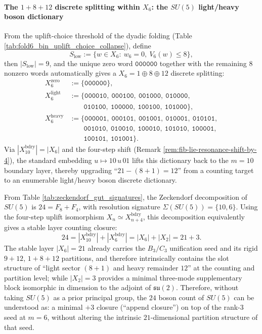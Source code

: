 \paragraph{The \(1+8+12\) discrete splitting within \texorpdfstring{$X_6$}{X6}: the \texorpdfstring{$SU(5)$}{SU(5)} light/heavy boson dictionary}
From the uplift-choice threshold of the dyadic folding (Table \ref{tab:fold6_bin_uplift_choice_collapse}), define
\[
S_{\mathrm{low}}:=\{w\in X_6:\ w_6=0,\ V_6(w)\le 8\},
\]
then \(|S_{\mathrm{low}}|=9\), and the unique zero word \(\texttt{000000}\) together with the remaining \(8\) nonzero words automatically gives a
\(
X_6=1\oplus 8\oplus 12
\)
discrete splitting:
\[
\begin{aligned}
X_6^{\mathrm{zero}}&:=\{\texttt{000000}\},\\
X_6^{\mathrm{light}}&:=\{\texttt{000010},\ \texttt{000100},\ \texttt{001000},\ \texttt{010000},\\
&\qquad \texttt{010100},\ \texttt{100000},\ \texttt{100100},\ \texttt{101000}\},\\
X_6^{\mathrm{heavy}}&:=\{\texttt{000001},\ \texttt{000101},\ \texttt{001001},\ \texttt{010001},\ \texttt{010101},\\
&\qquad \texttt{001010},\ \texttt{010010},\ \texttt{100010},\ \texttt{101010},\ \texttt{100001},\\
&\qquad \texttt{100101},\ \texttt{101001}\}.
\end{aligned}
\]
Via \(|X_{10}^{\mathrm{bdry}}|=|X_6|\) and the four-step shift (Remark \ref{rem:fib-lie-resonance-shift-by-4}),
the standard embedding \(u\mapsto 10\,u\,01\) lifts this dictionary back to the \(m=10\) boundary layer,
thereby upgrading ``\(21-(8+1)=12\)'' from a counting target to an enumerable light/heavy boson discrete dictionary.

\begin{corollary}[The \(21+3\) counting closure of \texorpdfstring{$SU(5)$}{SU(5)}: from the \(m=6\) unification seed to \(24\) slots]\label{cor:su5-21-plus-3-closure}
From Table \ref{tab:zeckendorf_gut_signatures}, the Zeckendorf decomposition of \(SU(5)\) is \(24=F_8+F_4\), with resolution signature
\(\Sigma(SU(5))=\{10,6\}\).
Using the four-step uplift isomorphism \(X_n\simeq X_{n+4}^{\mathrm{bdry}}\), this decomposition equivalently gives a stable layer counting closure:
\[
24=|X^{\mathrm{bdry}}_{10}|+|X^{\mathrm{bdry}}_{6}|=|X_{6}|+|X_{2}|=21+3.
\]
The stable layer \(|X_6|=21\) already carries the \(B_3/C_3\) unification seed and its rigid \(9+12\), \(1+8+12\) partitions, and therefore intrinsically contains the slot structure of ``light sector \((8+1)\) and heavy remainder \(12\)'' at the counting and partition level;
while \(|X_2|=3\) provides a minimal three-mode supplementary block isomorphic in dimension to the adjoint of \(\mathfrak{su}(2)\).
Therefore, without taking \(SU(5)\) as a prior principal group, the \(24\) boson count of \(SU(5)\) can be understood as: a minimal \(+3\) closure (``append closure'') on top of the rank-\(3\) seed at \(m=6\), without altering the intrinsic \(21\)-dimensional partition structure of that seed.
\end{corollary}

